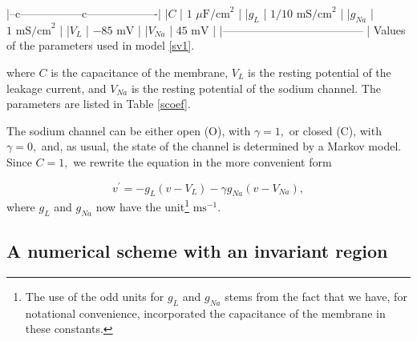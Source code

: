 |--c-----------------c-------------------|
|$C$        |  $1$ $\mu\text{F/cm}^{2}$  |
|$g_L$      | $1/10 \text{ mS/cm}^{2}$   |
|$g_{Na}$   | $1\text{ mS/cm}^{2}$       |
|$V_L$      | $-85\text{ mV}$            |
|$V_{Na}$   | $45\text{ mV}$             |
|--------------------------------------  |
Values of the parameters used in model \ref{sv1}.\label{scoef}

where $C$ is the capacitance of the membrane, $V_{L}$ is the resting potential
of the leakage current, and $V_{Na}$ is the resting potential of the sodium
channel. The parameters are listed in Table \ref{scoef}.


The sodium channel can be either open (O), with $\gamma=1,$ or closed (C), with
$\gamma=0,$ and, as usual, the state of the channel is determined by a Markov
model. Since $C=1,$ we rewrite the equation in the more convenient form

\begin{equation}
v^{\prime}=-g_{L}\left(  v-V_{L}\right)  -\gamma g_{Na}(v-V_{Na}), \label{sv2}
\end{equation}
where $g_{L}$ and $g_{Na}$ now have the unit\footnote{The use of the odd units for 
$g_{L}$ and $g_{Na}$ stems from the fact that we have, for notational
 convenience, incorporated the capacitance of the membrane in these constants.}
$\text{ms}^{-1}.$

\subsection{A numerical scheme with an invariant region}

